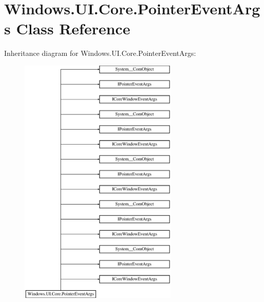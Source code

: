 \hypertarget{class_windows_1_1_u_i_1_1_core_1_1_pointer_event_args}{}\section{Windows.\+U\+I.\+Core.\+Pointer\+Event\+Args Class Reference}
\label{class_windows_1_1_u_i_1_1_core_1_1_pointer_event_args}
Inheritance diagram for Windows.\+U\+I.\+Core.\+Pointer\+Event\+Args\+:\begin{figure}[H]
\begin{center}
\leavevmode
\includegraphics[height=12.000000cm]{class_windows_1_1_u_i_1_1_core_1_1_pointer_event_args}
\end{center}
\end{figure}
